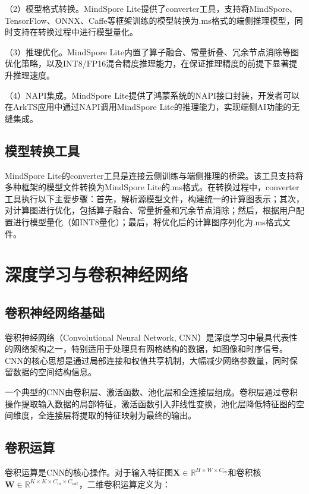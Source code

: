 （2）模型格式转换。MindSpore Lite提供了converter工具，支持将MindSpore、TensorFlow、ONNX、Caffe等框架训练的模型转换为.ms格式的端侧推理模型，同时支持在转换过程中进行模型量化。

（3）推理优化。MindSpore Lite内置了算子融合、常量折叠、冗余节点消除等图优化策略，以及INT8/FP16混合精度推理能力，在保证推理精度的前提下显著提升推理速度。

（4）NAPI集成。MindSpore Lite提供了鸿蒙系统的NAPI接口封装，开发者可以在ArkTS应用中通过NAPI调用MindSpore Lite的推理能力，实现端侧AI功能的无缝集成。

\subsection{模型转换工具}

MindSpore Lite的converter工具是连接云侧训练与端侧推理的桥梁。该工具支持将多种框架的模型文件转换为MindSpore Lite的.ms格式。在转换过程中，converter工具执行以下主要步骤：首先，解析源模型文件，构建统一的计算图表示；其次，对计算图进行优化，包括算子融合、常量折叠和冗余节点消除；然后，根据用户配置进行模型量化（如INT8量化）；最后，将优化后的计算图序列化为.ms格式文件。

\section{深度学习与卷积神经网络}

\subsection{卷积神经网络基础}

卷积神经网络（Convolutional Neural Network, CNN）是深度学习中最具代表性的网络架构之一，特别适用于处理具有网格结构的数据，如图像和时序信号。CNN的核心思想是通过局部连接和权值共享机制，大幅减少网络参数量，同时保留数据的空间结构信息。

一个典型的CNN由卷积层、激活函数、池化层和全连接层组成。卷积层通过卷积操作提取输入数据的局部特征，激活函数引入非线性变换，池化层降低特征图的空间维度，全连接层将提取的特征映射为最终的输出。

\subsection{卷积运算}

卷积运算是CNN的核心操作。对于输入特征图$\mathbf{X} \in \mathbb{R}^{H \times W \times C_{in}}$和卷积核$\mathbf{W} \in \mathbb{R}^{K \times K \times C_{in} \times C_{out}}$，二维卷积运算定义为：

